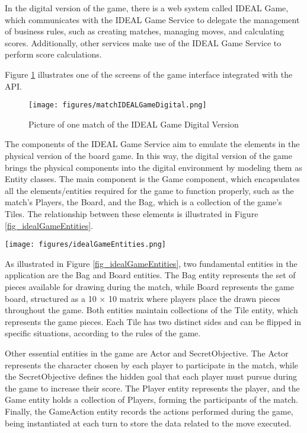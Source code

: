 \documentclass[english]{sbc2025}
\begin{document}
In the digital version of the game, there is a web system called IDEAL Game, which communicates with the IDEAL Game Service to delegate the management of business rules, such as creating matches, managing moves, and calculating scores. Additionally, other services make use of the IDEAL Game Service to perform score calculations. 

Figure \ref{fig_matchIDEALGameDigital} illustrates one of the screens of the game interface integrated with the API.

\begin{figure}[h]
  \centering
  \texttt{[image: figures/matchIDEALGameDigital.png]}
  \caption{Picture of one match of the IDEAL Game Digital Version}
  \label{fig_matchIDEALGameDigital}
\end{figure}

The components of the IDEAL Game Service aim to emulate the elements in the physical version of the board game. In this way, the digital version of the game brings the physical components into the digital environment by modeling them as Entity classes. The main component is the Game component, which encapsulates all the elements/entities required for the game to function properly, such as the match's Players, the Board, and the Bag, which is a collection of the game's Tiles. The relationship between these elements is illustrated in Figure \ref{fig_idealGameEntities}. 


\begin{figure*}[h]
  \centering
  \texttt{[image: figures/idealGameEntities.png]}
  \caption{Relation between entities of the IDEAL Game Service}
  \label{fig_idealGameEntities}
\end{figure*}

As illustrated in Figure \ref{fig_idealGameEntities}, two fundamental entities in the application are the Bag and Board entities. The Bag entity represents the set of pieces available for drawing during the match, while Board represents the game board, structured as a 10 × 10 matrix where players place the drawn pieces throughout the game. Both entities maintain collections of the Tile entity, which represents the game pieces. Each Tile has two distinct sides and can be flipped in specific situations, according to the rules of the game.

Other essential entities in the game are Actor and SecretObjective. The Actor represents the character chosen by each player to participate in the match, while the SecretObjective defines the hidden goal that each player must pursue during the game to increase their score. The Player entity represents the player, and the Game entity holds a collection of Players, forming the participants of the match. Finally, the GameAction entity records the actions performed during the game, being instantiated at each turn to store the data related to the move executed.
\end{document}
